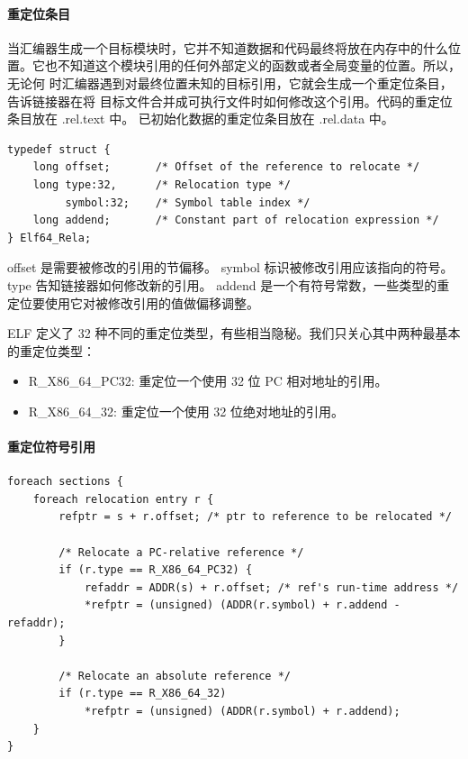 \paragraph{重定位条目}

当汇编器生成一个目标模块时，它并不知道数据和代码最终将放在内存中的什么位
置。它也不知道这个模块引用的任何外部定义的函数或者全局变量的位置。所以，无论何
时汇编器遇到对最终位置未知的目标引用，它就会生成一个重定位条目，告诉链接器在将
目标文件合并成可执行文件时如何修改这个引用。代码的重定位条目放在 .rel.text 中。
已初始化数据的重定位条目放在 .rel.data 中。

\begin{lstlisting}[style=CStyle]
typedef struct {
    long offset;       /* Offset of the reference to relocate */
    long type:32,      /* Relocation type */
         symbol:32;    /* Symbol table index */
    long addend;       /* Constant part of relocation expression */
} Elf64_Rela;
\end{lstlisting}

offset 是需要被修改的引用的节偏移。
symbol 标识被修改引用应该指向的符号。
type 告知链接器如何修改新的引用。
addend 是一个有符号常数，一些类型的重定位要使用它对被修改引用的值做偏移调整。

ELF 定义了 32 种不同的重定位类型，有些相当隐秘。我们只关心其中两种最基本的重定位类型：

\begin{itemize}
    \item  R\_X86\_64\_PC32: 重定位一个使用 32 位 PC 相对地址的引用。
    \item  R\_X86\_64\_32: 重定位一个使用 32 位绝对地址的引用。
\end{itemize}

\paragraph{重定位符号引用}

\begin{lstlisting}[style=CStyle]
foreach sections {
    foreach relocation entry r {
        refptr = s + r.offset; /* ptr to reference to be relocated */

        /* Relocate a PC-relative reference */
        if (r.type == R_X86_64_PC32) {
            refaddr = ADDR(s) + r.offset; /* ref's run-time address */
            *refptr = (unsigned) (ADDR(r.symbol) + r.addend - refaddr);
        }

        /* Relocate an absolute reference */
        if (r.type == R_X86_64_32)
            *refptr = (unsigned) (ADDR(r.symbol) + r.addend);
    }
}
\end{lstlisting}

